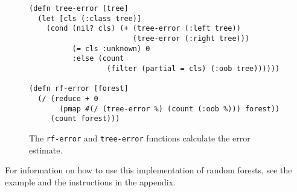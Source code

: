\documentclass[a4paper,man,12pt,apacite,floatsintext,draftfirst]{apa6} %
\begin{document}
\begin{figure}[H]
\caption{The \texttt{rf-error} and \texttt{tree-error} functions calculate the error estimate.}
\begin{verbatim}
(defn tree-error [tree]
  (let [cls (:class tree)]
    (cond (nil? cls) (+ (tree-error (:left tree))
                        (tree-error (:right tree)))
          (= cls :unknown) 0
          :else (count
                  (filter (partial = cls) (:oob tree))))))

(defn rf-error [forest]
  (/ (reduce + 0
       (pmap #(/ (tree-error %) (count (:oob %))) forest))
     (count forest)))
\end{verbatim}
\end{figure}

For information on how to use this implementation of random forests,
see the example and the instructions in the appendix.
\end{document}
